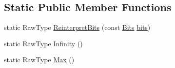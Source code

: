 \subsection*{Static Public Member Functions}
\begin{DoxyCompactItemize}
\item 
static Raw\-Type \hyperlink{classtesting_1_1internal_1_1FloatingPoint_ac551f793522e54fbd8a25acb79eac5b1}{Reinterpret\-Bits} (const \hyperlink{classtesting_1_1internal_1_1FloatingPoint_abf228bf6cd48f12c8b44c85b4971a731}{Bits} \hyperlink{classtesting_1_1internal_1_1FloatingPoint_abead51f16ec6ea84360a976da1cd1387}{bits})
\item 
static Raw\-Type \hyperlink{classtesting_1_1internal_1_1FloatingPoint_a460027cc19cf01ae8e09cc3796b2b575}{Infinity} ()
\item 
static Raw\-Type \hyperlink{classtesting_1_1internal_1_1FloatingPoint_aae5954d8a57d3ff0987c6930cb68e114}{Max} ()
\end{DoxyCompactItemize}
